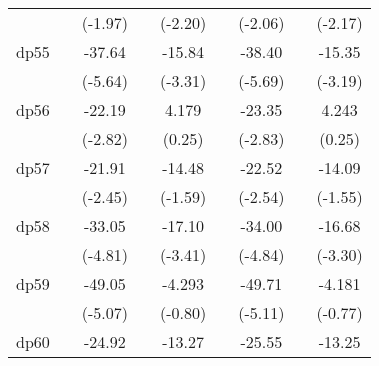 {\begin{tabular}{l*{8}{c}}
            &                     &     (-1.97)         &                     &     (-2.20)         &                     &     (-2.06)         &                     &     (-2.17)         \\
[1em]
dp55        &                     &      -37.64\sym{***}&                     &      -15.84\sym{***}&                     &      -38.40\sym{***}&                     &      -15.35\sym{**} \\
            &                     &     (-5.64)         &                     &     (-3.31)         &                     &     (-5.69)         &                     &     (-3.19)         \\
[1em]
dp56        &                     &      -22.19\sym{**} &                     &       4.179         &                     &      -23.35\sym{**} &                     &       4.243         \\
            &                     &     (-2.82)         &                     &      (0.25)         &                     &     (-2.83)         &                     &      (0.25)         \\
[1em]
dp57        &                     &      -21.91\sym{*}  &                     &      -14.48         &                     &      -22.52\sym{*}  &                     &      -14.09         \\
            &                     &     (-2.45)         &                     &     (-1.59)         &                     &     (-2.54)         &                     &     (-1.55)         \\
[1em]
dp58        &                     &      -33.05\sym{***}&                     &      -17.10\sym{***}&                     &      -34.00\sym{***}&                     &      -16.68\sym{***}\\
            &                     &     (-4.81)         &                     &     (-3.41)         &                     &     (-4.84)         &                     &     (-3.30)         \\
[1em]
dp59        &                     &      -49.05\sym{***}&                     &      -4.293         &                     &      -49.71\sym{***}&                     &      -4.181         \\
            &                     &     (-5.07)         &                     &     (-0.80)         &                     &     (-5.11)         &                     &     (-0.77)         \\
[1em]
dp60        &                     &      -24.92\sym{***}&                     &      -13.27\sym{**} &                     &      -25.55\sym{***}&                     &      -13.25\sym{**} \\

\end{tabular}}
